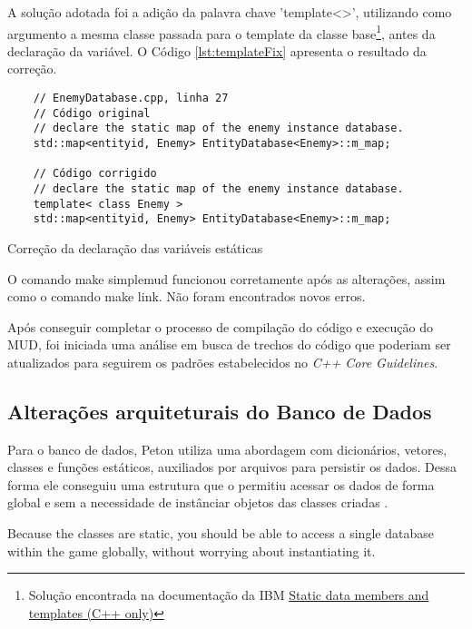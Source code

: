 A solução adotada foi a adição da palavra chave 'template<>', utilizando como argumento a mesma 
classe passada para o template da classe base\footnote{Solução encontrada na documentação da IBM 
\href{https://www.ibm.com/docs/en/zos/2.4.0?topic=only-static-data-members-templates-c}
{Static data members and templates (C++ only)}}, antes da declaração da variável. 
O Código \ref{lst:templateFix} apresenta o resultado da correção.

\begin{listing}[!ht]
    \begin{verbatim}
    // EnemyDatabase.cpp, linha 27
    // Código original
    // declare the static map of the enemy instance database.
    std::map<entityid, Enemy> EntityDatabase<Enemy>::m_map;

    // Código corrigido
    // declare the static map of the enemy instance database.
    template< class Enemy >
    std::map<entityid, Enemy> EntityDatabase<Enemy>::m_map;
    \end{verbatim}
\caption{Correção da declaração das variáveis estáticas}
\label{lst:templateFix}
\end{listing}

O comando make simplemud funcionou corretamente após as alterações, assim como o comando make link.
Não foram encontrados novos erros.

Após conseguir completar o processo de compilação do código e execução do MUD, 
foi iniciada uma análise em busca de trechos do código que poderiam ser atualizados
para seguirem os padrões estabelecidos no \textit{C++ Core Guidelines}.


\subsection{Alterações arquiteturais do Banco de Dados}

Para o banco de dados, Peton utiliza uma abordagem com dicionários, vetores, classes e funções estáticos, 
auxiliados por arquivos para persistir os dados. Dessa forma ele conseguiu uma estrutura que o 
permitiu acessar os dados de forma global e sem a necessidade de instânciar objetos das classes 
criadas \cite{penton2003mud}.

\begin{citacao}
    Because the classes are static, you should be able to access
    a single database within the game globally, without
    worrying about instantiating it.\cite{penton2003mud}
\end{citacao}

